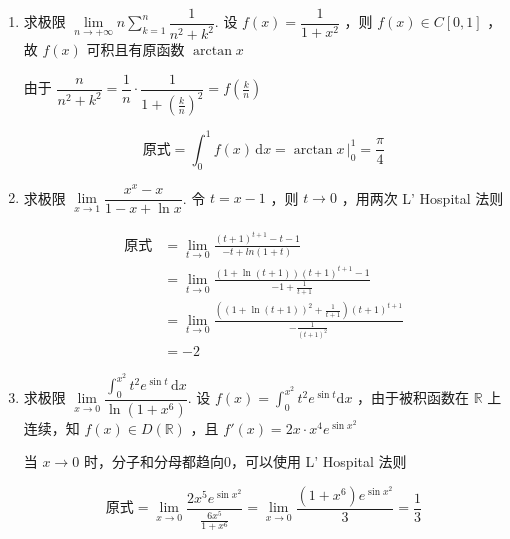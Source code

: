 \documentclass{jhwhw}
\begin{document}
        \begin{enumerate}
            \item 求极限 $\lim\limits_{n \to +\infty} n\sum\limits_{k=1}^n \dfrac{1}{n^2+k^2} $.
            \solution
            设 $f(x)=\dfrac{1}{1+x^2}$ ，则 $f(x) \in C[0,1]$ ，故 $f(x)$ 可积且有原函数 $\arctan{x}$

            由于 $\dfrac{n}{n^2+k^2}=\dfrac{1}{n}\cdot \dfrac{1}{1+\left( \frac{k}{n} \right)^2}
                                    =f\left(\frac{k}{n}\right)$

            \[
                \text{原式} = \int_{0}^{1} f(x) \,\text{d}x = \arctan{x} \,|_0^1 = \dfrac{\pi}{4}
            \]
            
            \item 求极限 $\lim\limits_{x \to 1} \dfrac{x^x-x}{1-x+\ln{x}}$.
            \solution
            令 $t=x-1$ ，则 $t \to 0$ ，用两次 L' Hospital 法则

            \begin{align*}
                \text{原式} &= \lim_{t \to 0} \frac{(t+1)^{t+1}-t-1}{-t+ln(1+t)} \\
                            &= \lim_{t \to 0} \frac{(1+\ln (t+1))(t+1)^{t+1}-1}{-1+\frac{1}{t+1}} \\
                            &= \lim_{t \to 0} \frac{((1+\ln (t+1))^2+\frac{1}{t+1})(t+1)^{t+1}}{-\frac{1}{(t+1)^2}} \\
                            &= -2
            \end{align*}

            \item 求极限 $\lim\limits_{x \to 0} \dfrac{\displaystyle\int_0^{x^2} t^2 e^{\sin t} \,\text{d}x}{\ln (1+x^6)} $.
            \solution
            设 $f(x)=\int_0^{x^2} t^2 e^{\sin t} \text{d}x$ ，由于被积函数在 $\mathbb{R}$ 上连续，知 $f(x) \in D( \mathbb{R} )$ ，且 $f'(x)=2x\cdot x^4 e^{\sin x^2}$
            
            当 $x \to 0$ 时，分子和分母都趋向0，可以使用 L' Hospital 法则

            \[
                \text{原式} = \lim_{x \to 0} \frac{2x^5 e^{\sin x^2}}{\frac{6x^5}{1+x^6}}
                            = \lim_{x \to 0} \frac{(1+x^6) e^{\sin x^2}}{3}
                            = \frac{1}{3}
            \]


\end{enumerate}
\end{document}
